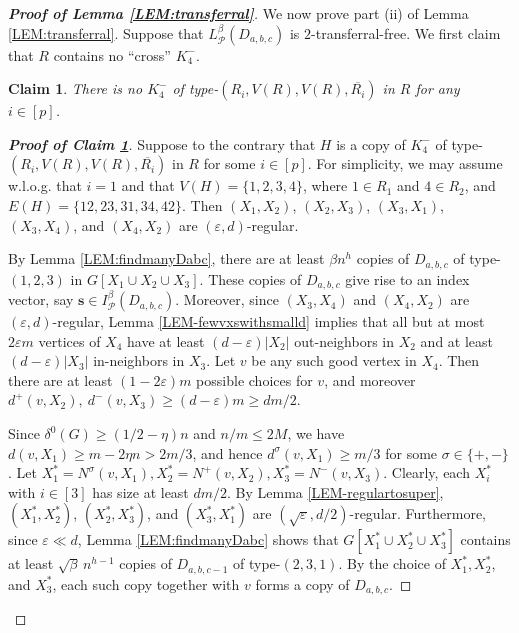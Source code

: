 \documentclass[11pt,a4paper,reqno]{amsart}
\newtheorem{claim}{Claim}
\theoremstyle{definition} %
\begin{document}
\begin{proof}[\textbf{Proof of Lemma \ref{LEM:transferral}}]
\medskip


We now prove part (ii) of Lemma \ref{LEM:transferral}. Suppose that $L_\mathcal{P}^\beta(D_{a,b,c})$ is $2$-transferral-free. We first claim that $R$ contains no ``cross'' $K_4^-$.
     
\begin{claim}\label{CLM-K4-}
There is no $K_4^-$ of type-$(R_i,V(R),V(R),\overline{R_i})$ in $R$ for any $i\in [p]$.
\end{claim}

\begin{proof}[\textbf{Proof of Claim \ref{CLM-K4-}}]
Suppose to the contrary that $H$ is a copy of $K_4^-$ of type-$(R_i,V(R),V(R),\overline{R_i})$ in $R$ for some $i\in [p]$. For simplicity, we may assume w.l.o.g. that $i=1$ and that $V(H)=\{1,2,3,4\}$, where $1\in R_1$ and $4\in R_2$, and $E(H)=\{12,23,31,34,42\}$. Then $(X_1,X_2)$, $(X_2,X_3)$, $(X_3,X_1)$, $(X_3,X_4)$, and $(X_4,X_2)$ are $(\varepsilon,d)$-regular.

By Lemma \ref{LEM:findmanyDabc}, there are at least $\beta n^{h}$ copies of $D_{a,b,c}$ of type-$(1,2,3)$ in $G[X_1\cup X_2\cup X_3]$. These copies of $D_{a,b,c}$ give rise to an index vector, say $\mathbf{s}\in I_\mathcal{P}^\beta(D_{a,b,c})$. Moreover, since $(X_3,X_4)$ and $(X_4,X_2)$ are $(\varepsilon,d)$-regular, Lemma \ref{LEM-fewvxswithsmalld} implies that all but at most $2\varepsilon m$ vertices of $X_4$ have at least $(d-\varepsilon)|X_2|$ out-neighbors in $X_2$ and at least $(d-\varepsilon)|X_3|$ in-neighbors in $X_3$. Let $v$ be any such good vertex in $X_4$. Then there are at least $(1-2\varepsilon)m$ possible choices for $v$, and moreover $d^+(v,X_2),\ d^-(v,X_3)\geqslant (d-\varepsilon)m\geqslant dm/2$.

Since $\delta^0(G)\geqslant (1/2-\eta)n$ and $n/m\leqslant 2M$, we have $d(v,X_1)\geqslant m-2\eta n > 2m/3$, 
and hence $d^{\sigma}(v,X_1)\geqslant m/3$ for some $\sigma\in\{+,-\}$. Let $X^\ast_1=N^{\sigma}(v,X_1), 
X^\ast_2=N^+(v,X_2), 
X^\ast_3=N^-(v,X_3)$.
Clearly, each $X_i^\ast$ with $i\in[3]$ has size at least $dm/2$. By Lemma \ref{LEM-regulartosuper}, $(X^\ast_1,X^\ast_2)$, $(X^\ast_2,X^\ast_3)$, and $(X^\ast_3,X^\ast_1)$ are $(\sqrt\varepsilon,d/2)$-regular. Furthermore, since $\varepsilon\ll d$, Lemma \ref{LEM:findmanyDabc} shows that $G[X^\ast_1\cup X^\ast_2\cup X^\ast_3]$ contains at least $\sqrt{\beta}\, n^{h-1}$ copies of $D_{a,b,c-1}$ of type-$(2,3,1)$. By the choice of $X^\ast_1,X^\ast_2$, and $X^\ast_3$, each such copy together with $v$ forms a copy of $D_{a,b,c}$.


\end{proof}
\end{proof}
\end{document}
